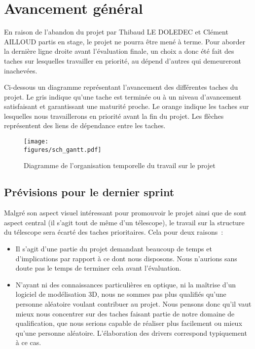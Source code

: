 \chapter{Avancement général}

En raison de l'abandon du projet par Thibaud LE DOLEDEC et Clément AILLOUD partis en stage, le projet ne pourra être mené à terme. Pour aborder la dernière ligne droite avant l'évaluation finale, un choix a donc été fait des taches sur lesquelles travailler en priorité, au dépend d'autres qui demeureront inachevées.

\vspace{1cm}

Ci-dessous un diagramme représentant l’avancement des différentes taches du projet. Le gris indique qu’une tache est terminée ou à un niveau d’avancement satisfaisant et garantissant une maturité proche. Le orange indique les taches sur lesquelles nous travaillerons en priorité avant la fin du projet. Les flèches représentent des liens de dépendance entre les taches.

\begin{figure}[H]
    \centering
	\texttt{[image: \\figures/sch\_gantt.pdf]}
    \decoRule
    \caption[
    Diagramme de l'organisation temporelle du travail sur le projet]{
    Diagramme de l'organisation temporelle du travail sur le projet}
    \label{fig:Diagramme de l'organisation temporelle du travail sur le projet}
    \end{figure}

\section{Prévisions pour le dernier sprint}

Malgré son aspect visuel intéressant pour promouvoir le projet ainsi que de sont aspect central (il s'agit tout de même d'un télescope), le travail sur la structure du télescope sera écarté des taches prioritaires. Cela pour deux raisons~:
\begin{itemize}[label=$\bullet$]
	\item Il s'agit d'une partie du projet demandant beaucoup de temps et d'implications par rapport à ce dont nous disposons. Nous n'aurions sans doute pas le temps de terminer cela avant l'évaluation.
	\item N'ayant ni des connaissances particulières en optique, ni la maîtrise d'un logiciel de modélisation 3D, nous ne sommes pas plus qualifiés qu'une personne aléatoire voulant contribuer au projet. Nous pensons donc qu'il vaut mieux nous concentrer sur des taches faisant partie de notre domaine de qualification, que nous serions capable de réaliser plus facilement ou mieux qu'une personne aléatoire. L'élaboration des drivers correspond typiquement à ce cas.
	\end{itemize}

